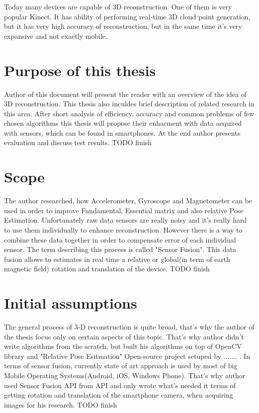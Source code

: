 Today many devices are capable of 3D reconstruction. One of them is very popular Kinect\cite{kinect}. It has ability of performing real-time 3D cloud point generation, but it has very high accuracy of reconstruction, but in the same time it's very expansive and not exactly mobile.

\section{Purpose of this thesis} %
Author of this document will present the reader with an overview of the idea of 3D reconstruction. This thesis also inculdes brief description of related research in this area. After short analysis of efficiency, accuracy and common problems of few chosen algorithms this thesis will propose their enhacment with data acquired with sensors, which can be found in smartphones. At the end author presents evaluation and discuss test results. TODO finish

\section{Scope}
The author researched, how Accelerometer, Gyroscope and Magnetometer can be used in order to improve Fundamental, Essential matrix and also relative Pose Estimation. Unfortunately raw data sensors are really noisy and it's really hard to use them individually to enhance reconstruction. However there is a way to combine these data together in order to compensate error of each individual sensor. The term describing this process is called "Sensor Fusion". This data fusion allows to estimates in real time a relative or global(in term of earth magnetic field) rotation and translation of the device. TODO finish
\section{Initial assumptions}
The general process of 3-D reconstruction is quite broad, that's why the author of the thesis focus only on certain aspects of this topic. That's why author didn't write algorithms from the scratch, but built his algorithms on top of OpenCV library and "Relative Pose Esitmation" Open-source project setuped by ....... . In terms of sensor fusion, currently state of art approach is used by most of big Mobile Operating Systems(Android, iOS, Windows Phone). That's why author used Sensor Fusion API from API and only wrote what's needed it terms of getting rotation and translation of the smartphone camera, when acquiring images for his research. TODO finish
